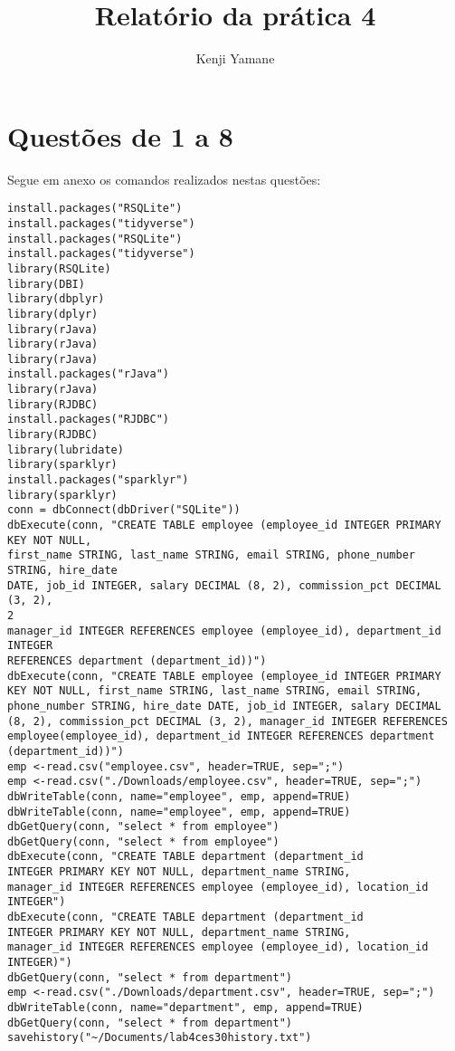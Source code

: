 \documentclass{article}[twocolumn]
\title{Relat\'orio da pr\'atica 4}
\author{Kenji Yamane}
\begin{document}
	\maketitle
	\section{Quest\~oes de 1 a 8}
	Segue em anexo os comandos realizados nestas quest\~oes:
	\begin{verbatim}
install.packages("RSQLite")
install.packages("tidyverse")
install.packages("RSQLite")
install.packages("tidyverse")
library(RSQLite)
library(DBI)
library(dbplyr)
library(dplyr)
library(rJava)
library(rJava)
library(rJava)
install.packages("rJava")
library(rJava)
library(RJDBC)
install.packages("RJDBC")
library(RJDBC)
library(lubridate)
library(sparklyr)
install.packages("sparklyr")
library(sparklyr)
conn = dbConnect(dbDriver("SQLite"))
dbExecute(conn, "CREATE TABLE employee (employee_id INTEGER PRIMARY KEY NOT NULL,
first_name STRING, last_name STRING, email STRING, phone_number STRING, hire_date
DATE, job_id INTEGER, salary DECIMAL (8, 2), commission_pct DECIMAL (3, 2),
2
manager_id INTEGER REFERENCES employee (employee_id), department_id INTEGER
REFERENCES department (department_id))")
dbExecute(conn, "CREATE TABLE employee (employee_id INTEGER PRIMARY KEY NOT NULL, first_name STRING, last_name STRING, email STRING, phone_number STRING, hire_date DATE, job_id INTEGER, salary DECIMAL (8, 2), commission_pct DECIMAL (3, 2), manager_id INTEGER REFERENCES employee(employee_id), department_id INTEGER REFERENCES department (department_id))")
emp <-read.csv("employee.csv", header=TRUE, sep=";")
emp <-read.csv("./Downloads/employee.csv", header=TRUE, sep=";")
dbWriteTable(conn, name="employee", emp, append=TRUE)
dbWriteTable(conn, name="employee", emp, append=TRUE)
dbGetQuery(conn, "select * from employee")
dbGetQuery(conn, "select * from employee")
dbExecute(conn, "CREATE TABLE department (department_id
INTEGER PRIMARY KEY NOT NULL, department_name STRING,
manager_id INTEGER REFERENCES employee (employee_id), location_id INTEGER")
dbExecute(conn, "CREATE TABLE department (department_id
INTEGER PRIMARY KEY NOT NULL, department_name STRING,
manager_id INTEGER REFERENCES employee (employee_id), location_id INTEGER)")
dbGetQuery(conn, "select * from department")
emp <-read.csv("./Downloads/department.csv", header=TRUE, sep=";")
dbWriteTable(conn, name="department", emp, append=TRUE)
dbGetQuery(conn, "select * from department")
savehistory("~/Documents/lab4ces30history.txt")
	\end{verbatim}
\end{document}
